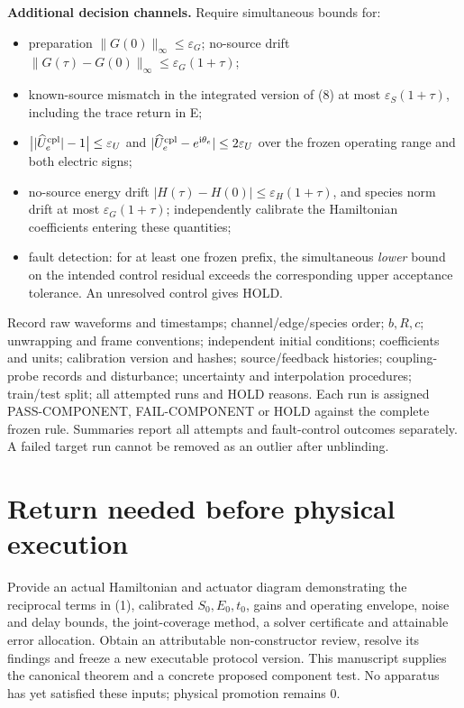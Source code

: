 \documentclass[10pt,a4paper]{article}
\newcommand{\ii}{\mathrm i}
\begin{document}
\textbf{Additional decision channels.} Require simultaneous bounds for:
\begin{itemize}[leftmargin=*]
\item preparation $\|G(0)\|_\infty\le\varepsilon_G$; no-source drift $\|G(\tau)-G(0)\|_\infty\le\varepsilon_G(1+\tau)$;
\item known-source mismatch in the integrated version of (8) at most $\varepsilon_S(1+\tau)$, including the trace return in E;
\item $\big||\widehat U_e^{\rm cpl}|-1\big|\le\varepsilon_U$ and $|\widehat U_e^{\rm cpl}-e^{\ii\theta_e}|\le2\varepsilon_U$ over the frozen operating range and both electric signs;
\item no-source energy drift $|H(\tau)-H(0)|\le\varepsilon_H(1+\tau)$, and species norm drift at most $\varepsilon_G(1+\tau)$; independently calibrate the Hamiltonian coefficients entering these quantities;
\item fault detection: for at least one frozen prefix, the simultaneous \emph{lower} bound on the intended control residual exceeds the corresponding upper acceptance tolerance. An unresolved control gives HOLD.
\end{itemize}
Record raw waveforms and timestamps; channel/edge/species order; $b,R,c$; unwrapping and frame conventions; independent initial conditions; coefficients and units; calibration version and hashes; source/feedback histories; coupling-probe records and disturbance; uncertainty and interpolation procedures; train/test split; all attempted runs and HOLD reasons. Each run is assigned PASS-COMPONENT, FAIL-COMPONENT or HOLD against the complete frozen rule. Summaries report all attempts and fault-control outcomes separately. A failed target run cannot be removed as an outlier after unblinding.

\section{Return needed before physical execution}
Provide an actual Hamiltonian and actuator diagram demonstrating the reciprocal terms in (1), calibrated $S_0,E_0,t_0$, gains and operating envelope, noise and delay bounds, the joint-coverage method, a solver certificate and attainable error allocation. Obtain an attributable non-constructor review, resolve its findings and freeze a new executable protocol version. This manuscript supplies the canonical theorem and a concrete proposed component test. No apparatus has yet satisfied these inputs; physical promotion remains 0.
\end{document}
